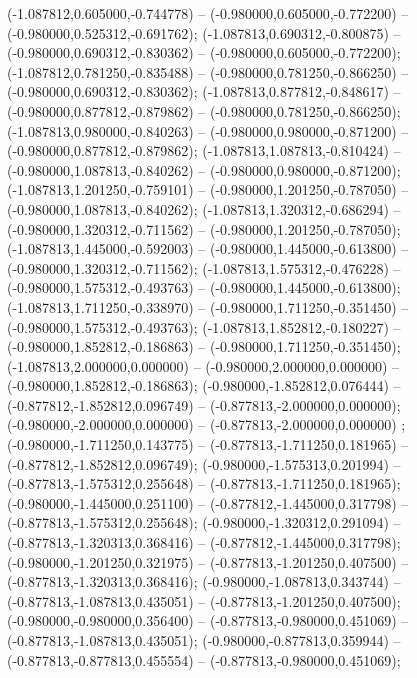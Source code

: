  (-1.087812,0.605000,-0.744778) -- (-0.980000,0.605000,-0.772200) -- (-0.980000,0.525312,-0.691762);
 (-1.087813,0.690312,-0.800875) -- (-0.980000,0.690312,-0.830362) -- (-0.980000,0.605000,-0.772200);
 (-1.087812,0.781250,-0.835488) -- (-0.980000,0.781250,-0.866250) -- (-0.980000,0.690312,-0.830362);
 (-1.087813,0.877812,-0.848617) -- (-0.980000,0.877812,-0.879862) -- (-0.980000,0.781250,-0.866250);
 (-1.087813,0.980000,-0.840263) -- (-0.980000,0.980000,-0.871200) -- (-0.980000,0.877812,-0.879862);
 (-1.087813,1.087813,-0.810424) -- (-0.980000,1.087813,-0.840262) -- (-0.980000,0.980000,-0.871200);
 (-1.087813,1.201250,-0.759101) -- (-0.980000,1.201250,-0.787050) -- (-0.980000,1.087813,-0.840262);
 (-1.087813,1.320312,-0.686294) -- (-0.980000,1.320312,-0.711562) -- (-0.980000,1.201250,-0.787050);
 (-1.087813,1.445000,-0.592003) -- (-0.980000,1.445000,-0.613800) -- (-0.980000,1.320312,-0.711562);
 (-1.087813,1.575312,-0.476228) -- (-0.980000,1.575312,-0.493763) -- (-0.980000,1.445000,-0.613800);
 (-1.087813,1.711250,-0.338970) -- (-0.980000,1.711250,-0.351450) -- (-0.980000,1.575312,-0.493763);
 (-1.087813,1.852812,-0.180227) -- (-0.980000,1.852812,-0.186863) -- (-0.980000,1.711250,-0.351450);
 (-1.087813,2.000000,0.000000) -- (-0.980000,2.000000,0.000000) -- (-0.980000,1.852812,-0.186863);
 (-0.980000,-1.852812,0.076444) -- (-0.877812,-1.852812,0.096749) -- (-0.877813,-2.000000,0.000000);
 (-0.980000,-2.000000,0.000000) -- (-0.877813,-2.000000,0.000000) ;
 (-0.980000,-1.711250,0.143775) -- (-0.877813,-1.711250,0.181965) -- (-0.877812,-1.852812,0.096749);
 (-0.980000,-1.575313,0.201994) -- (-0.877813,-1.575312,0.255648) -- (-0.877813,-1.711250,0.181965);
 (-0.980000,-1.445000,0.251100) -- (-0.877812,-1.445000,0.317798) -- (-0.877813,-1.575312,0.255648);
 (-0.980000,-1.320312,0.291094) -- (-0.877813,-1.320313,0.368416) -- (-0.877812,-1.445000,0.317798);
 (-0.980000,-1.201250,0.321975) -- (-0.877813,-1.201250,0.407500) -- (-0.877813,-1.320313,0.368416);
 (-0.980000,-1.087813,0.343744) -- (-0.877813,-1.087813,0.435051) -- (-0.877813,-1.201250,0.407500);
 (-0.980000,-0.980000,0.356400) -- (-0.877813,-0.980000,0.451069) -- (-0.877813,-1.087813,0.435051);
 (-0.980000,-0.877813,0.359944) -- (-0.877813,-0.877813,0.455554) -- (-0.877813,-0.980000,0.451069);
